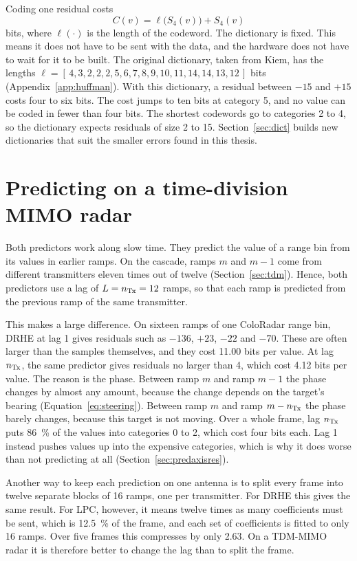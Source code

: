 \label{sec:huffman}
Coding one residual costs
\begin{equation}
\label{eq:cost}
C(v) = \ell\bigl(S_4(v)\bigr) + S_4(v)
\end{equation}
bits, where $\ell(\cdot)$ is the length of the codeword. The dictionary is
fixed. This means it does not have to be sent with the data, and the hardware
does not have to wait for it to be built. The original dictionary, taken from
Kiem, has the lengths
$\ell = [\,4,3,2,2,2,5,6,7,8,9,10,11,14,14,13,12\,]$ bits
(Appendix~\ref{app:huffman}). With this dictionary, a residual between $-15$
and $+15$ costs four to six bits. The cost jumps to ten bits at category 5, and
no value can be coded in fewer than four bits. The shortest codewords go to
categories 2 to 4, so the dictionary expects residuals of size 2 to 15.
Section~\ref{sec:dict} builds new dictionaries that suit the smaller errors
found in this thesis.

\section{Predicting on a time-division MIMO radar}
\label{sec:predaxis}

Both predictors work along slow time. They predict the value of a range bin
from its values in earlier ramps. On the cascade, ramps $m$ and $m-1$ come from
different transmitters eleven times out of twelve (Section~\ref{sec:tdm}).
Hence, both predictors use a lag of $L = n_{\mathrm{Tx}} = 12$ ramps, so that each ramp is
predicted from the previous ramp of the same transmitter.

This makes a large difference. On sixteen ramps of one ColoRadar range bin,
DRHE at lag 1 gives residuals such as $-136$, $+23$, $-22$ and $-70$. These are
often larger than the samples themselves, and they cost \num{11.00} bits per
value. At lag $n_{\mathrm{Tx}}$, the same predictor gives residuals no larger than 4, which
cost \num{4.12} bits per value. The reason is the phase. Between ramp $m$ and
ramp $m-1$ the phase changes by almost any amount, because the change depends
on the target's bearing (Equation~\eqref{eq:steering}). Between ramp $m$ and
ramp $m-n_{\mathrm{Tx}}$ the phase barely changes, because this target is not moving.
Over a whole frame, lag $n_{\mathrm{Tx}}$ puts \SI{86}{\percent} of the values into
categories 0 to 2, which cost four bits each. Lag 1 instead pushes values up
into the expensive categories, which is why it does worse than not predicting
at all (Section~\ref{sec:predaxisres}).

Another way to keep each prediction on one antenna is to split every frame into
twelve separate blocks of 16 ramps, one per transmitter. For DRHE this gives
the same result. For LPC, however, it means twelve times as many coefficients
must be sent, which is \SI{12.5}{\percent} of the frame, and each set of
coefficients is fitted to only 16 ramps. Over five frames this compresses by
only \num{2.63}. On a TDM-MIMO radar it is therefore better to change the lag
than to split the frame.

